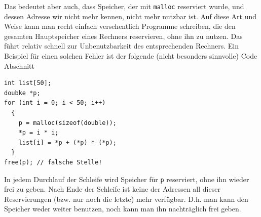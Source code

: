 Das bedeutet aber auch, dass Speicher, der mit \verb|malloc| reserviert wurde, und dessen Adresse wir nicht mehr kennen, nicht mehr nutzbar ist.
Auf diese Art und Weise kann man recht einfach versehentlich Programme schreiben, die den gesamten Hauptspeicher eines Rechners reservieren, ohne ihn zu nutzen.
Das führt relativ schnell zur Unbenutzbarkeit des entsprechenden Rechners.
Ein Beispiel für einen solchen Fehler ist der folgende (nicht besonders sinnvolle) Code Abschnitt
\begin{lstlisting}
int list[50];
doubke *p;
for (int i = 0; i < 50; i++)
  {
    p = malloc(sizeof(double));
    *p = i * i;
    list[i] = *p + (*p) * (*p);
  }
free(p); // falsche Stelle!
\end{lstlisting}
In jedem Durchlauf der Schleife wird Speicher für \verb|p| reserviert, ohne ihn wieder frei zu geben.
Nach Ende der Schleife ist keine der Adressen all dieser Reservierungen (bzw. nur noch die letzte) mehr verfügbar.
D.h. man kann den Speicher weder weiter benutzen, noch kann man ihn nachträglich frei geben.

\endinput
